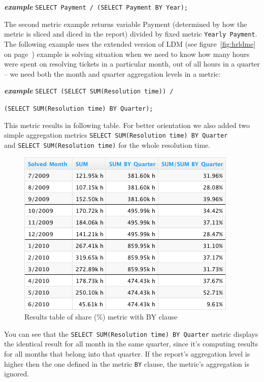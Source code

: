 \documentclass[a4paper, 12pt, titlepage, fleqn]{article}
\begin{document}
\textbf{\emph{example}}  \hspace{.9cm}\verb=SELECT Payment / (SELECT Payment BY Year);=

The second metric example returns variable Payment (determined by how the metric is sliced and diced in the report) divided by fixed metric \verb=Yearly Payment=. The following example uses the extended version of LDM (see figure~\ref{fig:hrldme} on page~\pageref{fig:hrldme}) example is solving situation when we need to know how many hours were spent on resolving tickets in a particular month, out of all hours in a quarter -- we need both the month and quarter aggregation levels in a metric:

\textbf{\emph{example}}  \hspace{.9cm}\verb=SELECT (SELECT SUM(Resolution time)) /=

\hspace{2.4cm}\verb=(SELECT SUM(Resolution time) BY Quarter);=

This metric results in following table. For better orientation we also added two simple aggregation metrics \verb=SELECT SUM(Resolution time) BY Quarter=\\ and \verb=SELECT SUM(Resolution time)= for the whole resolution time.

\begin{figure}[htb]
\centering
\includegraphics[scale=0.6]{images/by-metric.png}
\caption{Results table of share (\%) metric with BY clause}
\label{fig:share}
\end{figure}

You can see that the \verb=SELECT SUM(Resolution time) BY Quarter= metric displays the identical result for all month in the same quarter, since it's computing results for all months that belong into that quarter. If the report's aggregation level is higher then the one defined in the metric \verb=BY= clause, the metric's aggregation is ignored. 
\end{document}

